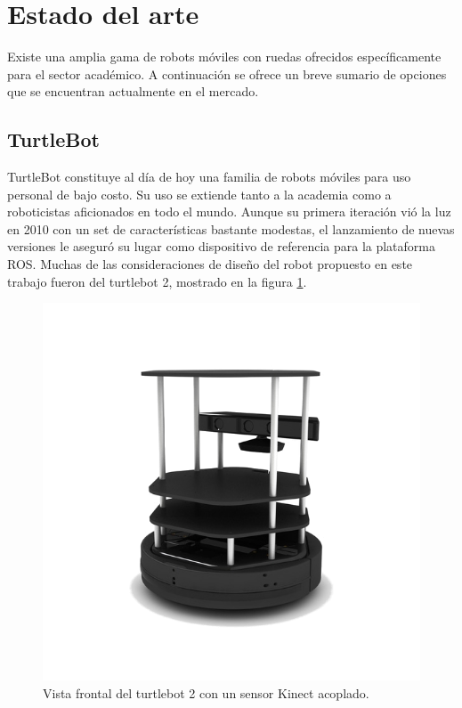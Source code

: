\newpage

\section{Estado del arte}

Existe una amplia gama de robots móviles con ruedas ofrecidos específicamente para el sector académico. A continuación se ofrece un breve sumario de opciones que se encuentran actualmente en el mercado.
\subsection{TurtleBot}

TurtleBot constituye al día de hoy una familia de robots móviles para uso personal de bajo costo. Su uso se extiende tanto a la academia como a roboticistas aficionados en todo el mundo.\newline
Aunque su primera iteración vió la luz en 2010 con un set de características bastante modestas, el lanzamiento de nuevas versiones le aseguró su lugar como dispositivo de referencia para la plataforma ROS. \newline
Muchas de las consideraciones de diseño del robot propuesto en este trabajo fueron del turtlebot 2, mostrado en la figura \ref{fig:robotTurtlebot}.

\begin{figure}[ht]
	\centering
	\includegraphics[scale=1.5]{./Figures/turtlebot.png}
	\caption{Vista frontal del turtlebot 2 con un sensor Kinect acoplado.\protect\footnotemark}
	\label{fig:robotTurtlebot}
\end{figure}

